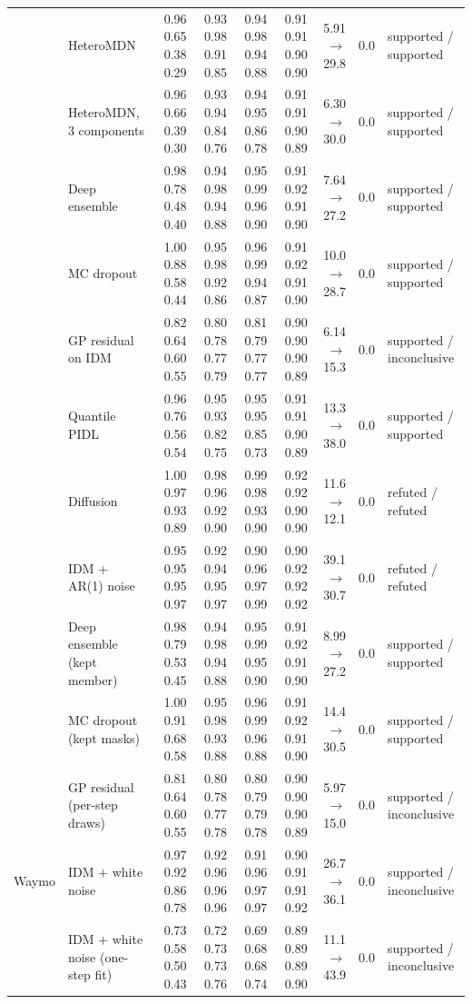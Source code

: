\begin{longtable}{llrrrrrrl}
 & HeteroMDN & 0.96 0.65 0.38 0.29 & 0.93 0.98 0.91 0.85 & 0.94 0.98 0.94 0.88 & 0.91 0.91 0.90 0.90 & 5.91 $\rightarrow$ 29.8 & 0.0 & supported / supported \\
 & HeteroMDN, 3 components & 0.96 0.66 0.39 0.30 & 0.93 0.94 0.84 0.76 & 0.94 0.95 0.86 0.78 & 0.91 0.91 0.90 0.89 & 6.30 $\rightarrow$ 30.0 & 0.0 & supported / supported \\
 & Deep ensemble & 0.98 0.78 0.48 0.40 & 0.94 0.98 0.94 0.88 & 0.95 0.99 0.96 0.90 & 0.91 0.92 0.91 0.90 & 7.64 $\rightarrow$ 27.2 & 0.0 & supported / supported \\
 & MC dropout & 1.00 0.88 0.58 0.44 & 0.95 0.98 0.92 0.86 & 0.96 0.99 0.94 0.87 & 0.91 0.92 0.91 0.90 & 10.0 $\rightarrow$ 28.7 & 0.0 & supported / supported \\
 & GP residual on IDM & 0.82 0.64 0.60 0.55 & 0.80 0.78 0.77 0.79 & 0.81 0.79 0.77 0.77 & 0.90 0.90 0.90 0.89 & 6.14 $\rightarrow$ 15.3 & 0.0 & supported / inconclusive \\
 & Quantile PIDL & 0.96 0.76 0.56 0.54 & 0.95 0.93 0.82 0.75 & 0.95 0.95 0.85 0.73 & 0.91 0.91 0.90 0.89 & 13.3 $\rightarrow$ 38.0 & 0.0 & supported / supported \\
 & Diffusion & 1.00 0.97 0.93 0.89 & 0.98 0.96 0.92 0.90 & 0.99 0.98 0.93 0.90 & 0.92 0.92 0.90 0.90 & 11.6 $\rightarrow$ 12.1 & 0.0 & refuted / refuted \\
 & IDM + AR(1) noise & 0.95 0.95 0.95 0.97 & 0.92 0.94 0.95 0.97 & 0.90 0.96 0.97 0.99 & 0.90 0.92 0.92 0.92 & 39.1 $\rightarrow$ 30.7 & 0.0 & refuted / refuted \\
 & Deep ensemble (kept member) & 0.98 0.79 0.53 0.45 & 0.94 0.98 0.94 0.88 & 0.95 0.99 0.95 0.90 & 0.91 0.92 0.91 0.90 & 8.99 $\rightarrow$ 27.2 & 0.0 & supported / supported \\
 & MC dropout (kept masks) & 1.00 0.91 0.68 0.58 & 0.95 0.98 0.93 0.88 & 0.96 0.99 0.96 0.88 & 0.91 0.92 0.91 0.90 & 14.4 $\rightarrow$ 30.5 & 0.0 & supported / supported \\
 & GP residual (per-step draws) & 0.81 0.64 0.60 0.55 & 0.80 0.78 0.77 0.78 & 0.80 0.79 0.79 0.78 & 0.90 0.90 0.90 0.89 & 5.97 $\rightarrow$ 15.0 & 0.0 & supported / inconclusive \\
\midrule
Waymo & IDM + white noise & 0.97 0.92 0.86 0.78 & 0.92 0.96 0.96 0.96 & 0.91 0.96 0.97 0.97 & 0.90 0.91 0.91 0.92 & 26.7 $\rightarrow$ 36.1 & 0.0 & supported / inconclusive \\
 & IDM + white noise (one-step fit) & 0.73 0.58 0.50 0.43 & 0.72 0.73 0.73 0.76 & 0.69 0.68 0.68 0.74 & 0.89 0.89 0.89 0.90 & 11.1 $\rightarrow$ 43.9 & 0.0 & supported / inconclusive \\

\end{longtable}
